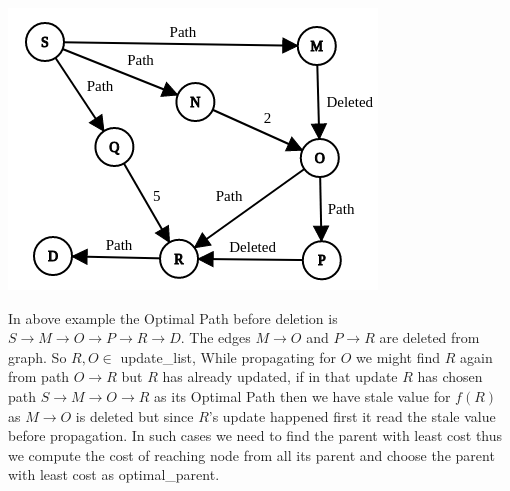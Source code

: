 \documentclass[a4paper]{article}
\begin{document}
\begin{center}
\includegraphics[scale=0.45]{img/Delete1.png}    
\end{center}
In above example the Optimal Path before deletion is $S \rightarrow M \rightarrow O \rightarrow P \rightarrow R \rightarrow D $.
The edges $ M \rightarrow O$ and $P \rightarrow R$ are deleted from graph. So $R,O \in $ update\_list, While propagating for $O$ we might find $R$ again from path $O \rightarrow R$ but $R$ has already updated, if in that update $R$ has chosen path $S \rightarrow M \rightarrow O \rightarrow R$ as its Optimal Path then we have stale value for $f(R)$ as $M \rightarrow O$ is deleted but since $R$'s update happened first it read the stale value before propagation. In such cases we need to find the parent with least cost thus we compute the cost of reaching node from all its parent and choose the parent with least cost as optimal\_parent.

 
\end{document}

